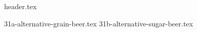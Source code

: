 \clearpage
{}
\divisorLine
{header.tex}
\begin{multicols*}{2}
{31a-alternative-grain-beer.tex}
{31b-alternative-sugar-beer.tex}
\end{multicols*}